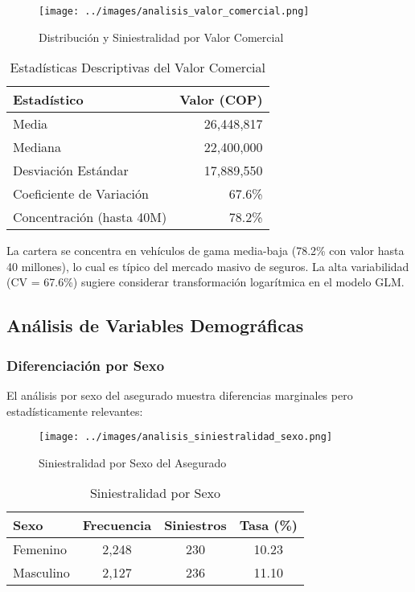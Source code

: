\begin{figure}[H]
\centering
\texttt{[image: ../images/analisis\_valor\_comercial.png]}
\caption{Distribución y Siniestralidad por Valor Comercial}
\end{figure}

\begin{table}[H]
\centering
\caption{Estadísticas Descriptivas del Valor Comercial}
\begin{tabular}{|l|r|}
\hline
\textbf{Estadístico} & \textbf{Valor (COP)} \\
\hline
Media & 26,448,817 \\
Mediana & 22,400,000 \\
Desviación Estándar & 17,889,550 \\
Coeficiente de Variación & 67.6\% \\
Concentración (hasta 40M) & 78.2\% \\
\hline
\end{tabular}
\end{table}

La cartera se concentra en vehículos de gama media-baja (78.2\% con valor hasta 40 millones), lo cual es típico del mercado masivo de seguros. La alta variabilidad (CV = 67.6\%) sugiere considerar transformación logarítmica en el modelo GLM.

\subsection{Análisis de Variables Demográficas}

\subsubsection{Diferenciación por Sexo}

El análisis por sexo del asegurado muestra diferencias marginales pero estadísticamente relevantes:

\begin{figure}[H]
\centering
\texttt{[image: ../images/analisis\_siniestralidad\_sexo.png]}
\caption{Siniestralidad por Sexo del Asegurado}
\end{figure}

\begin{table}[H]
\centering
\caption{Siniestralidad por Sexo}
\begin{tabular}{|l|c|c|c|}
\hline
\textbf{Sexo} & \textbf{Frecuencia} & \textbf{Siniestros} & \textbf{Tasa (\%)} \\
\hline
Femenino & 2,248 & 230 & 10.23 \\
Masculino & 2,127 & 236 & 11.10 \\
\hline
\end{tabular}
\end{table}

